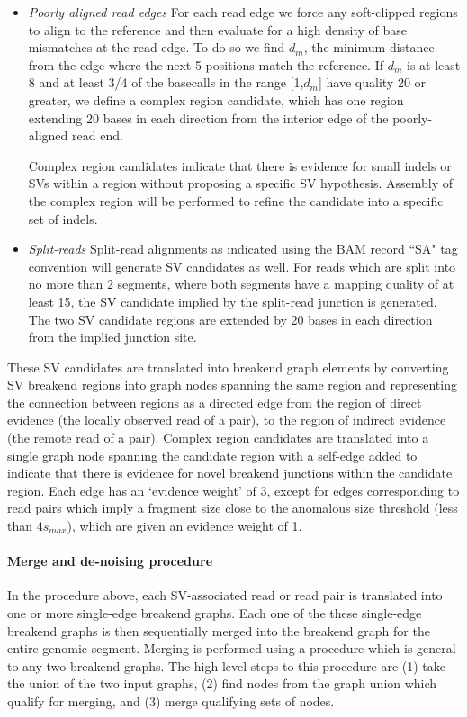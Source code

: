 \documentclass{article}
\begin{document}
\begin{itemize}
\item \textit{Poorly aligned read edges} For each read edge we force any soft-clipped regions to align to the reference and then evaluate for a high density of base mismatches at the read edge. To do so we find $d_{m}$, the minimum distance from the edge where the next 5 positions match the reference. If $d_{m}$ is at least 8 and at least 3/4 of the basecalls in the range [1,$d_{m}$] have quality 20 or greater, we define a complex region candidate, which has one region extending 20 bases in each direction from the interior edge of the poorly-aligned read end.

Complex region candidates indicate that there is evidence for small indels or SVs within a region without proposing a specific SV hypothesis. Assembly of the complex region will be performed to refine the candidate into a specific set of indels.

\item \textit{Split-reads} Split-read alignments as indicated using the BAM record ``SA" tag convention will generate SV candidates as well. For reads which are split into no more than 2 segments, where both segments have a mapping quality of at least 15, the SV candidate implied by the split-read junction is generated. The two SV candidate regions are extended by 20 bases in each direction from the implied junction site.

\end{itemize}

These SV candidates are translated into breakend graph elements by converting SV breakend regions into graph nodes spanning the same region and representing the connection between regions as a directed edge from the region of direct evidence (the locally observed read of a pair), to the region of indirect evidence (the remote read of a pair). Complex region candidates are translated into a single graph node spanning the candidate region with a self-edge added to indicate that there is evidence for novel breakend junctions within the candidate region. Each edge has an `evidence weight' of 3, except for edges corresponding to read pairs which imply a fragment size close to the anomalous size threshold (less than $4s_{max}$), which are given an evidence weight of 1.

\paragraph{Merge and de-noising procedure}

In the procedure above, each SV-associated read or read pair is translated into one or more single-edge breakend graphs. Each one of the these single-edge breakend graphs is then sequentially merged into the breakend graph for the entire genomic segment. Merging is performed using a procedure which is general to any two breakend graphs. The high-level steps to this procedure are (1) take the union of the two input graphs, (2) find nodes from the graph union which qualify for merging, and (3) merge qualifying sets of nodes.
\end{document}
